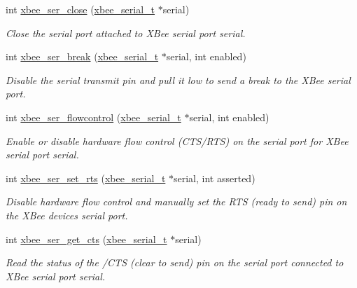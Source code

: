 \begin{DoxyCompactItemize}
int \hyperlink{group__hal__rabbit_ga48b9d743a446074ea6abacd0de24044d}{xbee\+\_\+ser\+\_\+close} (\hyperlink{structxbee__serial__t}{xbee\+\_\+serial\+\_\+t} $\ast$serial)
\begin{DoxyCompactList}\small\item\em Close the serial port attached to X\+Bee serial port {\itshape serial}. \end{DoxyCompactList}\item 
int \hyperlink{group__hal__rabbit_ga6ae89792415a7ac8b45b56188eb9eeb4}{xbee\+\_\+ser\+\_\+break} (\hyperlink{structxbee__serial__t}{xbee\+\_\+serial\+\_\+t} $\ast$serial, int enabled)
\begin{DoxyCompactList}\small\item\em Disable the serial transmit pin and pull it low to send a break to the X\+Bee serial port. \end{DoxyCompactList}\item 
int \hyperlink{group__hal__rabbit_ga1f5f72ffdfbfb45ac523640db32296ff}{xbee\+\_\+ser\+\_\+flowcontrol} (\hyperlink{structxbee__serial__t}{xbee\+\_\+serial\+\_\+t} $\ast$serial, int enabled)
\begin{DoxyCompactList}\small\item\em Enable or disable hardware flow control (C\+T\+S/\+R\+TS) on the serial port for X\+Bee serial port {\itshape serial}. \end{DoxyCompactList}\item 
int \hyperlink{group__hal__rabbit_ga731188d8cf41d3d749bc84d51b672535}{xbee\+\_\+ser\+\_\+set\+\_\+rts} (\hyperlink{structxbee__serial__t}{xbee\+\_\+serial\+\_\+t} $\ast$serial, int asserted)
\begin{DoxyCompactList}\small\item\em Disable hardware flow control and manually set the R\+TS (ready to send) pin on the X\+Bee device\textquotesingle{}s serial port. \end{DoxyCompactList}\item 
int \hyperlink{group__hal__rabbit_ga894f6fadc890b5ba5ce32338f0acd217}{xbee\+\_\+ser\+\_\+get\+\_\+cts} (\hyperlink{structxbee__serial__t}{xbee\+\_\+serial\+\_\+t} $\ast$serial)
\begin{DoxyCompactList}\small\item\em Read the status of the /\+C\+TS (clear to send) pin on the serial port connected to X\+Bee serial port {\itshape serial}. \end{DoxyCompactList}\end{DoxyCompactItemize}


